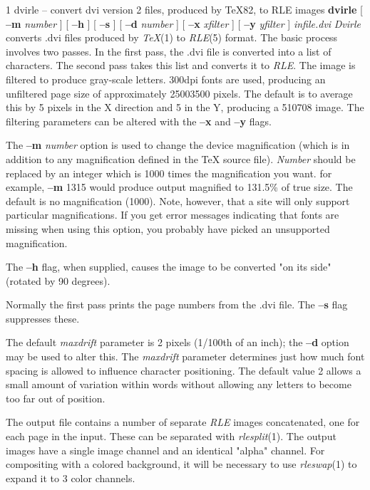 %
%
%
 1
dvirle -- convert dvi version 2 files, produced by TeX82, to RLE images
{\bf dvirle}
[
{\bf --m}
{\it number}
] [
{\bf --h}
] [
{\bf --s}
] [
{\bf --d}
{\it number}
] [
{\bf --x}
{\it xfilter}
] [
{\bf --y}
{\it yfilter}
]
{\it infile.dvi}
{\it Dvirle}
converts .dvi files produced by
{\it TeX}{\rm (1)}
to
{\it RLE}{\rm (5)}
format.  The basic process involves two passes.  In the first
pass, the .dvi file is converted into a list of characters.
The second pass takes this list and converts it to
{\it RLE}{\rm .}
The image is filtered to produce gray-scale letters.  300dpi fonts are
used, producing an unfiltered page size of approximately 25003500
pixels.  The default is to average this by 5 pixels in the X direction
and 5 in the Y, producing a 510708 image.  The filtering parameters can be
altered with the 
{\bf --x}
and
{\bf --y}
flags.

The
{\bf --m}
{\it number}
option is used to change the device magnification (which is in addition to
any magnification defined in the TeX source file).
{\it Number}
should be replaced by an integer which is 1000 times the magnification
you want.
for example,
{\bf --m} 1315
would produce output magnified to 131.5\% of true size.  The default is
no magnification (1000).  Note, however, that a site will only
support particular magnifications.  If you get error messages indicating that
fonts are missing when using this option, you probably have picked an
unsupported magnification.

The
{\bf --h}
flag, when
supplied, causes the image to be converted "on its side" (rotated by
90 degrees).

Normally the first pass prints the page numbers from the .dvi file.  The
{\bf --s}
flag suppresses these.

The default
{\it maxdrift}
parameter is 2 pixels (1/100th of an inch); the
{\bf --d}
option may be used to alter this.  The
{\it maxdrift}
parameter determines just how much font spacing is allowed to
influence character positioning.  The default value 2 allows a small
amount of variation within words without allowing any letters to
become too far out of position.

The output file contains a number of separate 
{\it RLE}
images concatenated, one for each page in the input.  These can be
separated with
{\it rlesplit}{\rm (1).}
The output images have a single image channel and
an identical "alpha" channel.  For compositing with a colored
background, it will be necessary to use 
{\it rleswap}{\rm (1)}
to expand it to 3 color channels.

